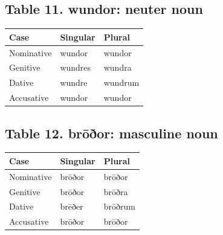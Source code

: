 \subsection*{Table 11. wundor: neuter noun}

\par\begingroup
\fontsize{10.5}{13.2}\selectfont
\setlength{\LTleft}{0pt}\setlength{\LTright}{\fill}
\noindent
\begin{tabular}{@{}>{\raggedright\arraybackslash}p{39.46mm}>{\raggedright\arraybackslash}p{39.46mm}>{\raggedright\arraybackslash}p{39.46mm}@{}}
\toprule
\textbf{Case} & \textbf{Singular} & \textbf{Plural} \\
\midrule
Nominative & wundor & wundor \\
Genitive & wundres & wundra \\
Dative & wundre & wundrum \\
Accusative & wundor & wundor \\
\bottomrule
\end{tabular}
\par\endgroup

\subsection*{Table 12. brōðor: masculine noun}

\par\begingroup
\fontsize{10.5}{13.2}\selectfont
\setlength{\LTleft}{0pt}\setlength{\LTright}{\fill}
\noindent
\begin{tabular}{@{}>{\raggedright\arraybackslash}p{39.46mm}>{\raggedright\arraybackslash}p{39.46mm}>{\raggedright\arraybackslash}p{39.46mm}@{}}
\toprule
\textbf{Case} & \textbf{Singular} & \textbf{Plural} \\
\midrule
Nominative & brōðor & brōðor \\
Genitive & brōðor & brōðra \\
Dative & brēðer & brōðrum \\
Accusative & brōðor & brōðor \\
\bottomrule
\end{tabular}
\par\endgroup


